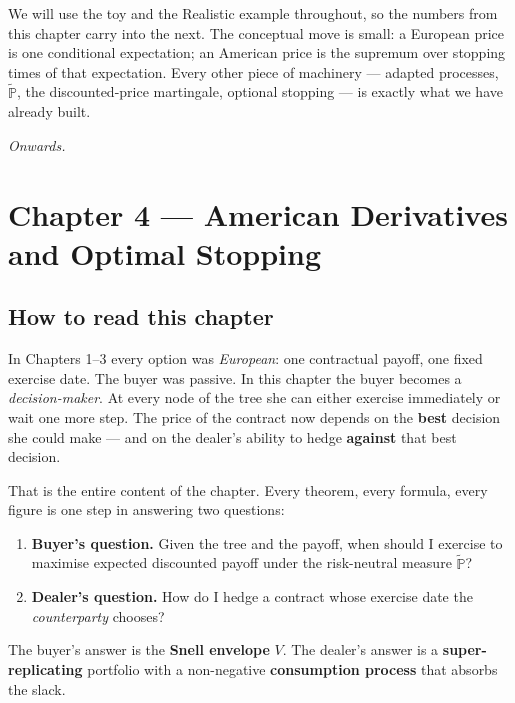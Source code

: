 \documentclass[
  10pt,
  twoside]{book}
\providecommand{\tightlist}{%
  \setlength{\itemsep}{0pt}\setlength{\parskip}{0pt}}
\begin{document}
We will use the toy and the Realistic example throughout, so the numbers
from this chapter carry into the next. The conceptual move is small: a
European price is one conditional expectation; an American price is the
supremum over stopping times of that expectation. Every other piece of
machinery --- adapted processes, \(\tilde{\mathbb P}\), the
discounted-price martingale, optional stopping --- is exactly what we
have already built.

\emph{Onwards.}

\newpage

\chapter{Chapter 4 --- American Derivatives and Optimal
Stopping}\label{chapter-4-american-derivatives-and-optimal-stopping}

\section{How to read this chapter}\label{how-to-read-this-chapter-3}

In Chapters 1--3 every option was \emph{European}: one contractual
payoff, one fixed exercise date. The buyer was passive. In this chapter
the buyer becomes a \emph{decision-maker}. At every node of the tree she
can either exercise immediately or wait one more step. The price of the
contract now depends on the \textbf{best} decision she could make ---
and on the dealer's ability to hedge \textbf{against} that best
decision.

That is the entire content of the chapter. Every theorem, every formula,
every figure is one step in answering two questions:

\begin{enumerate}
\def\labelenumi{\arabic{enumi}.}
\tightlist
\item
  \textbf{Buyer's question.} Given the tree and the payoff, when should
  I exercise to maximise expected discounted payoff under the
  risk-neutral measure \(\tilde{\mathbb{P}}\)?
\item
  \textbf{Dealer's question.} How do I hedge a contract whose exercise
  date the \emph{counterparty} chooses?
\end{enumerate}

The buyer's answer is the \textbf{Snell envelope} \(V\). The dealer's
answer is a \textbf{super-replicating} portfolio with a non-negative
\textbf{consumption process} that absorbs the slack.
\end{document}
